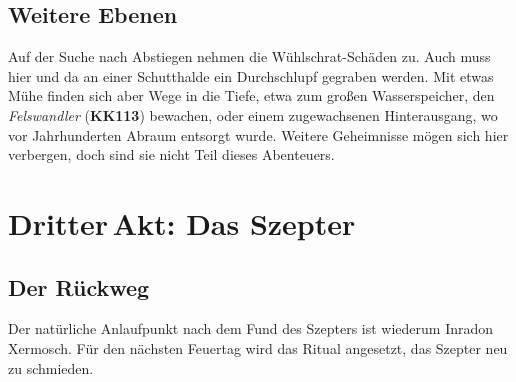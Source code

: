 \subsection{Weitere Ebenen}
Auf der Suche nach Abstiegen nehmen die Wühlschrat-Schäden zu. Auch muss hier und da an einer Schutthalde ein Durchschlupf gegraben werden.
Mit etwas Mühe finden sich aber Wege in die Tiefe, etwa zum großen Wasserspeicher, den \emph{Felswandler} (\textbf{KK113}) bewachen, oder einem zugewachsenen Hinterausgang, wo vor Jahrhunderten Abraum entsorgt wurde.
Weitere Geheimnisse mögen sich hier verbergen, doch sind sie nicht Teil dieses Abenteuers.

\spaltenende

\neueseite

\section{Dritter\,Akt: Das Szepter}
\spaltenanfang
\subsection{Der Rückweg}
\label{zuruck}


Der natürliche Anlaufpunkt nach dem Fund des Szepters ist wiederum Inradon Xermosch.
Für den nächsten Feuertag wird das Ritual angesetzt, das Szepter neu zu schmieden.
